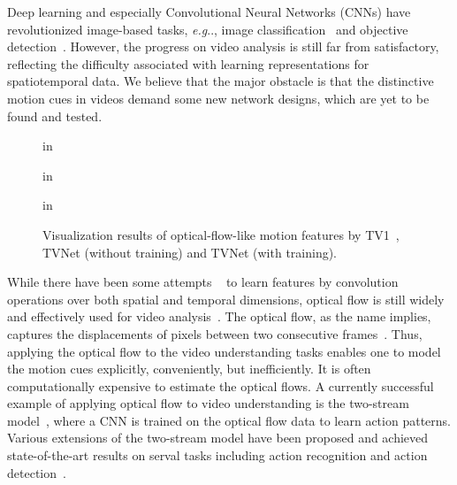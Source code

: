 \documentclass[10pt,twocolumn,letterpaper]{article}
\makeatletter
\DeclareRobustCommand\onedot{\futurelet\@let@token\@onedot}
\def\@onedot{\ifx\@let@token.\else.\null\fi\xspace}
\def\eg{\emph{e.g}\onedot} \def\Eg{\emph{E.g}\onedot}
\makeatother
\begin{document}
Deep learning and especially Convolutional Neural Networks (CNNs) have revolutionized image-based tasks, \eg, image classification~\cite{he2016deep} and objective detection~\cite{ren2015faster}. However, the progress on video analysis is still far from satisfactory, reflecting the difficulty associated with learning representations for spatiotemporal data. We believe that the major obstacle is that the distinctive motion cues  in videos demand some new network designs, which are yet  to be found and tested.

\begin{figure}[!ht]
 in
\begin{center}
 in
\caption{Visualization results of optical-flow-like motion features by TV1~\cite{zach2007duality}, TVNet (without training) and TVNet (with training).}
\label{Fig:intro}
\end{center}
 in
\end{figure}

While there have been some attempts ~\cite{tran2015learning} to learn features by convolution operations over both spatial and temporal dimensions, optical flow is still widely and effectively used for video analysis~\cite{Ng_CVPR15,Feichtenhofer_NIPS16,Feichtenhofer_CVPR16,Wang_ECCV16,gkioxari2015finding,peng2016multi}.
The optical flow, as the name implies, captures the displacements of pixels between two consecutive frames~\cite{zach2007duality}. Thus,
applying the optical flow to the video understanding tasks enables one to model the motion cues explicitly, conveniently, but inefficiently. It is often computationally expensive to estimate the optical flows.
A currently successful example of applying optical flow to video understanding is the two-stream model~\cite{Simonyan_NIPS14}, where a CNN is trained on the optical flow data to learn action patterns.
Various extensions of the two-stream model have been proposed and achieved state-of-the-art results on serval tasks including action recognition \cite{Ng_CVPR15,Feichtenhofer_NIPS16,Feichtenhofer_CVPR16,Wang_ECCV16} and action detection~\cite{gkioxari2015finding,peng2016multi}.
\end{document}
